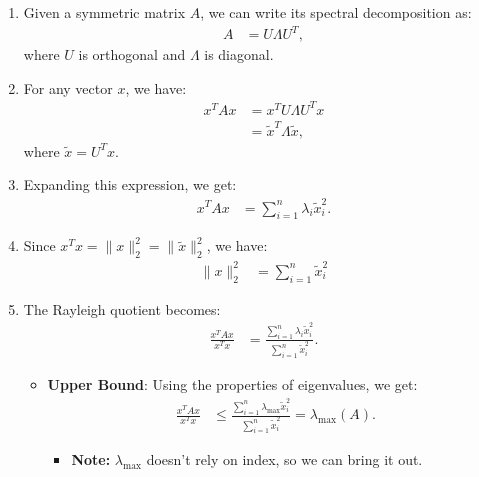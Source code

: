 \begin{derivation}
    \begin{enumerate}
        \item Given a symmetric matrix $A$, we can write its spectral decomposition as:
        \begin{align*}
            A &= U \Lambda U^T,
        \end{align*}
        where $U$ is orthogonal and $\Lambda$ is diagonal.
    
        \item For any vector $x$, we have:
        \begin{align*}
            x^T A x &= x^T U \Lambda U^T x \\
                    &= \tilde{x}^T \Lambda \tilde{x},
        \end{align*}
        where $\tilde{x} = U^T x$.
    
        \item Expanding this expression, we get:
        \begin{align*}
            x^T A x &= \sum_{i=1}^n \lambda_i \tilde{x}_i^2.
        \end{align*}
    
        \item Since $x^T x = \|x\|_2^2 = \|\tilde{x}\|_2^2$, we have:
        \begin{align*}
            \|x\|_2^2 &= \sum_{i=1}^n \tilde{x}_i^2
        \end{align*}
    
        \item The Rayleigh quotient becomes:
        \begin{align*}
            \frac{x^T A x}{x^T x} &= \frac{\sum_{i=1}^n \lambda_i \tilde{x}_i^2}{\sum_{i=1}^n \tilde{x}_i^2}.
        \end{align*}
        \begin{itemize}
            \item \textbf{Upper Bound}: Using the properties of eigenvalues, we get:
            \begin{align*}
                \frac{x^T A x}{x^T x} &\leq \frac{\sum_{i=1}^n \lambda_{\max} \tilde{x}_i^2}{\sum_{i=1}^n \tilde{x}_i^2} = \lambda_{\max}(A).
            \end{align*}
            \begin{itemize}
                \item \textbf{Note:} $\lambda_{\text{max}}$ doesn't rely on index, so we can bring it out.
            \end{itemize}
        

\end{itemize}
\end{enumerate}
\end{derivation}
